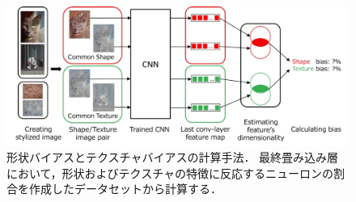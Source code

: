 \begin{figure}[h]
    \centering
    \includegraphics[width=\linewidth]{fig/IslamSTB.pdf}
    \caption[形状バイアスとテクスチャバイアスの計算手法]{形状バイアスとテクスチャバイアスの計算手法．
    最終畳み込み層において，形状およびテクスチャの特徴に反応するニューロンの割合を作成したデータセットから計算する．}
    \label{fig:IslamSTB}
\end{figure}

